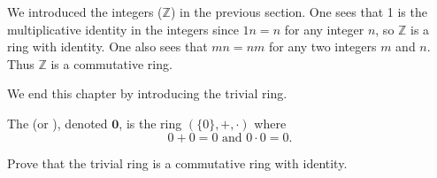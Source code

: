 \begin{example}
    We introduced the integers ($\mathbb{Z}$) in the previous section. One sees that 1 is the multiplicative identity in the integers since $1n = n$ for any integer $n$, so $\mathbb{Z}$ is a ring with identity. One also sees that $mn = nm$ for any two integers $m$ and $n$. Thus $\mathbb{Z}$ is a commutative ring.
\end{example}

We end this chapter by introducing the trivial ring.

\begin{definition}
    The  (or ), denoted $\textbf{0}$, is the ring $(\{0\}, +, \cdot)$ where
    \[
        0 + 0 = 0 \text{ and } 0 \cdot 0 = 0.
    \]
\end{definition}
\begin{exercise}
    Prove that the trivial ring is a commutative ring with identity.
\end{exercise}
